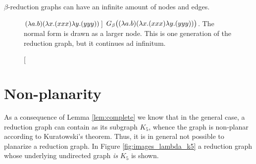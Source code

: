 \fact
$\beta$-reduction graphs can have an infinite amount of nodes and edges.
\begin{figure}[htpb]
	\centering
	\caption
	[$(\lambda a.b) (\lambda x.(xxx) \lambda y.(yyy))$]
	{$G_\beta\big((\lambda a.b) (\lambda x.(xxx) \lambda y.(yyy))\big)$. The normal form is drawn
	as a larger node. This is one generation of the reduction graph, but it 
	continues ad infinitum.}
	\label{fig:images_inf_reduction_graph}
\end{figure}



\section{Non-planarity}

As a consequence of Lemma \ref{lem:complete} we know that in the general case,
a reduction graph can contain as its subgraph $K_5$, whence the graph is
non-planar according to Kuratowski's theorem. Thus, it is in general not
possible to planarize a reduction graph. In Figure \ref{fig:images_lambda_k5}
a reduction graph whose underlying undirected graph \emph{is} $K_5$ is shown.

